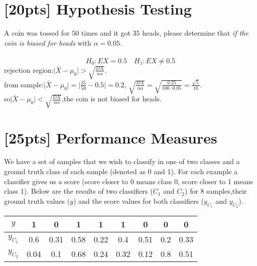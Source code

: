 \documentclass{article}
\begin{document}
\section{[20pts] Hypothesis Testing}
A coin was tossed for $50$ times and it got $35$ heads, please determine that \emph{if the coin is biased for heads} with $\alpha = 0.05$.\\\\
\begin{equation}
    H_0:EX=0.5 \quad H_1:EX\neq0.5
\end{equation}
rejection region:$\lvert \bar{X}-\mu_0 \rvert>\sqrt{\frac{DX}{n\alpha}}$.\\
from sample:$\lvert \bar{X}-\mu_0 \rvert=\lvert \frac{35}{50}-0.5 \rvert=0.2$,
$\sqrt{\frac{DX}{n\alpha}}=\sqrt{\frac{0.25}{100\cdot0.05}}=\frac{\sqrt{5}}{10}$.\\
so$\lvert \bar{X}-\mu_0 \rvert<\sqrt{\frac{DX}{n\alpha}}$,the coin is not biased for heads.

\section{[25pts] Performance Measures}
We have a set of samples that we wish to classify in one of two classes and a ground truth class of each sample (denoted as 0 and 1). For each example a classifier gives us a score (score closer to 0 means class 0, score closer to 1 means class 1). Below are the results of two classifiers ($C_1$ and $C_2$) for 8 samples,their ground truth values ($y$) and the score values for both classifiers ($y_{C_1}$ and $y_{C_2}$).
\begin{table}[htbp]
    \centering
    \begin{tabular}{c|cccccccc}
        \hline
        $y$ & 1 & 0 & 1 & 1 & 1 & 0 & 0 & 0\\
        \hline
        $y_{C_1}$ & 0.6 & 0.31 & 0.58 & 0.22 & 0.4 & 0.51 & 0.2 & 0.33\\
        \hline
        $y_{C_2}$ & 0.04 & 0.1 & 0.68 & 0.24 & 0.32 & 0.12 & 0.8 & 0.51\\
        \hline
    \end{tabular}
\end{table}
\end{document}
